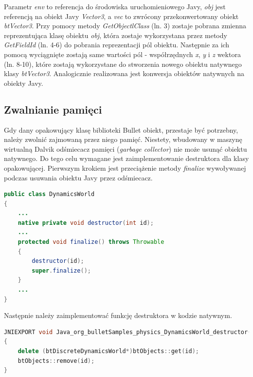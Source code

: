 

Parametr \emph{env} to referencja do środowiska uruchomieniowego Javy,
\emph{obj} jest referencją na obiekt Javy \emph{Vector3}, a \emph{vec} to
zwrócony przekonwertowany obiekt \emph{btVector3}. Przy pomocy metody
\emph{GetObjectlClass} (ln. 3) zostaje pobrana zmienna reprezentująca klasę
obiektu \emph{obj}, która zostaje wykorzystana przez metody
\emph{GetFieldId} (ln. 4-6) do pobrania reprezentacji pól obiektu. Następnie za
ich pomocą wyciągnięte zostają same wartości pól - współrzędnych \emph{x},
\emph{y} i \emph{z} wektora (ln. 8-10), które zostają wykorzystane do stworzenia
nowego obiektu natywnego klasy \emph{btVector3}. Analogicznie realizowana jest
konwersja obiektów natywnych na obiekty Javy.

\subsection{Zwalnianie pamięci}
Gdy dany opakowujący klasę biblioteki Bullet obiekt, przestaje być potrzebny,
należy zwolnić zajmowaną przez niego pamięć. Niestety, wbudowany w maszynę
wirtualną Dalvik odśmiecacz pamięci (\emph{garbage collector}) nie może usunąć
obiektu natywnego. Do tego celu wymagane jest zaimplementowanie destruktora dla
klasy opakowującej. Pierwszym krokiem jest przeciążenie metody \emph{finalize}
wywoływanej podczas usuwania obiektu Javy przez odśmiecacz.

\begin{lstlisting}[language=Java, caption=Przeciążenie metody \emph{finalize}
na przykładzie klasy \emph{DynamicsWorld}] public class DynamicsWorld
{
	...
	native private void destructor(int id);
	...
	protected void finalize() throws Throwable
	{
		destructor(id);
		super.finalize();
	}
	...
}
\end{lstlisting}

Następnie należy zaimplementować funkcję destruktora w kodzie natywnym.

\begin{lstlisting}[language=c++, caption=Implementacja funkcji
\emph{destructor} na przykładzie klasy \emph{DynamicsWorld}]
JNIEXPORT void Java_org_bulletSamples_physics_DynamicsWorld_destructor( JNIEnv* env, jobject self, jint id )
{
	delete (btDiscreteDynamicsWorld*)btObjects::get(id);
	btObjects::remove(id);
}
\end{lstlisting}

